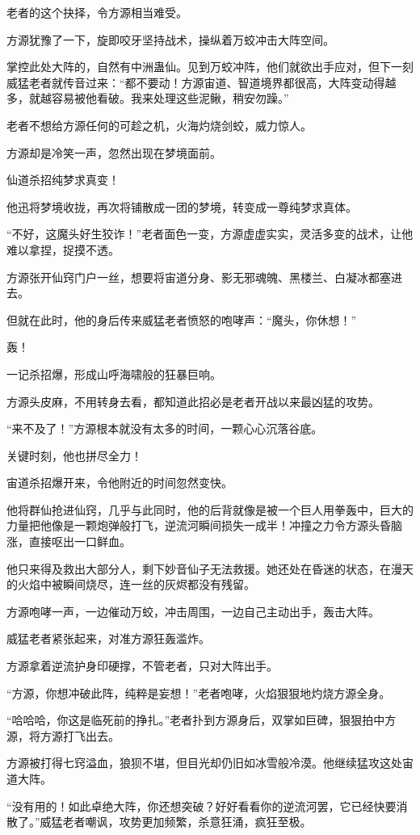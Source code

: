 \begin{this_body}
老者的这个抉择，令方源相当难受。

方源犹豫了一下，旋即咬牙坚持战术，操纵着万蛟冲击大阵空间。

掌控此处大阵的，自然有中洲蛊仙。见到万蛟冲阵，他们就欲出手应对，但下一刻威猛老者就传音过来：“都不要动！方源宙道、智道境界都很高，大阵变动得越多，就越容易被他看破。我来处理这些泥鳅，稍安勿躁。”

老者不想给方源任何的可趁之机，火海灼烧剑蛟，威力惊人。

方源却是冷笑一声，忽然出现在梦境面前。

仙道杀招纯梦求真变！

他迅将梦境收拢，再次将铺散成一团的梦境，转变成一尊纯梦求真体。

“不好，这魔头好生狡诈！”老者面色一变，方源虚虚实实，灵活多变的战术，让他难以拿捏，捉摸不透。

方源张开仙窍门户一丝，想要将宙道分身、影无邪魂魄、黑楼兰、白凝冰都塞进去。

但就在此时，他的身后传来威猛老者愤怒的咆哮声：“魔头，你休想！”

轰！

一记杀招爆，形成山呼海啸般的狂暴巨响。

方源头皮麻，不用转身去看，都知道此招必是老者开战以来最凶猛的攻势。

“来不及了！”方源根本就没有太多的时间，一颗心心沉落谷底。

关键时刻，他也拼尽全力！

宙道杀招爆开来，令他附近的时间忽然变快。

他将群仙抢进仙窍，几乎与此同时，他的后背就像是被一个巨人用拳轰中，巨大的力量把他像是一颗炮弹般打飞，逆流河瞬间损失一成半！冲撞之力令方源头昏脑涨，直接呕出一口鲜血。

他只来得及救出大部分人，剩下妙音仙子无法救援。她还处在昏迷的状态，在漫天的火焰中被瞬间烧尽，连一丝的灰烬都没有残留。

方源咆哮一声，一边催动万蛟，冲击周围，一边自己主动出手，轰击大阵。

威猛老者紧张起来，对准方源狂轰滥炸。

方源拿着逆流护身印硬撑，不管老者，只对大阵出手。

“方源，你想冲破此阵，纯粹是妄想！”老者咆哮，火焰狠狠地灼烧方源全身。

“哈哈哈，你这是临死前的挣扎。”老者扑到方源身后，双掌如巨碑，狠狠拍中方源，将方源打飞出去。

方源被打得七窍溢血，狼狈不堪，但目光却仍旧如冰雪般冷漠。他继续猛攻这处宙道大阵。

“没有用的！如此卓绝大阵，你还想突破？好好看看你的逆流河罢，它已经快要消散了。”威猛老者嘲讽，攻势更加频繁，杀意狂涌，疯狂至极。


\end{this_body}
